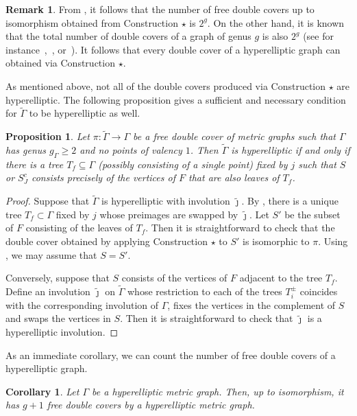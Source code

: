 \documentclass[11pt]{article}
\newtheorem{prop}[theo]{Proposition}
\newtheorem{coro}[theo]{Corollary}
\theoremstyle{definition}
\newtheorem{rema}[theo]{Remark}
\numberwithin{equation}{section}
\theoremstyle{definition}
\newcommand{\tGa}{\widetilde{\Gamma}}
\newcommand{\Ga}{\Gamma}
\newcommand{\tj}{\widetilde{\jmath}}
\newcommand{\wt}[1]{\widetilde{#1}}
\begin{document}
{\begin{rema}
     From ,  it follows that the number of  free double covers up to isomorphism obtained from Construction $\star$ is $2^g$. On the other hand, it is known that the total number of double covers of a graph of genus $g$ is also $2^g$ (see for instance~\cite[Construction A,B]{LZ22},~\cite[Section 5]{JensenLen_thetachars}, or~\cite{Waller_DoubleCoversOfGraphs}). It follows that every double cover of a hyperelliptic graph can obtained via  Construction $\star$.
\end{rema}

As mentioned above, not all of the double covers produced via Construction $\star$  are hyperelliptic. 
The following proposition gives a sufficient and necessary condition for $\tGa$ to be hyperelliptic as well. 

\begin{prop}\label{constrhypcovers}
     Let $\pi\colon \tGa\to \Gamma$ be a free double cover of metric graphs such that $\Gamma$ has  genus $g_{\Ga}\geq 2$ and no points of valency $1$. 
Then $\tGa$ is hyperelliptic if and only if there is a tree $T_f\subseteq\Gamma$ (possibly consisting of a single point) fixed by $j$ such that $S$ or $S^c_J$ consists precisely of the vertices of $F$ that are also leaves of $T_f$. 
\end{prop}

     \begin{proof} 
Suppose that $\wt\Gamma$ is hyperelliptic with involution $\tj$. By   , there is a unique tree $T_f\subset\Gamma$ fixed by $j$ whose preimages are swapped by $\tj$. Let   $S'$ be the subset of $F$ consisting  of the leaves of $T_f$. Then it is straightforward to check that  
the double cover obtained by applying Construction $\star$ to $S'$ is isomorphic to $\pi$. Using , we may assume that $S=S'$. 

Conversely, suppose that $S$ consists of the vertices of $F$ adjacent to the tree $T_f$. Define an involution $\tj$ on $\wt\Gamma$ whose restriction to each of the trees $T_i^{\pm}$ coincides with the corresponding involution of $\Gamma$, fixes the vertices in the complement of $S$ and swaps the vertices in $S$. Then it is straightforward to check that $\tj$ is a hyperelliptic involution. 
     \end{proof}


As an immediate corollary, we can count the number of free double covers of a hyperelliptic graph. 

\begin{coro}\label{cor:numberOfHyperelliptic}
   Let $\Gamma$ be a hyperelliptic metric graph. Then, up to isomorphism, it has $g+1$ free double covers by a hyperelliptic metric graph.
\end{coro}
}
\end{document}
